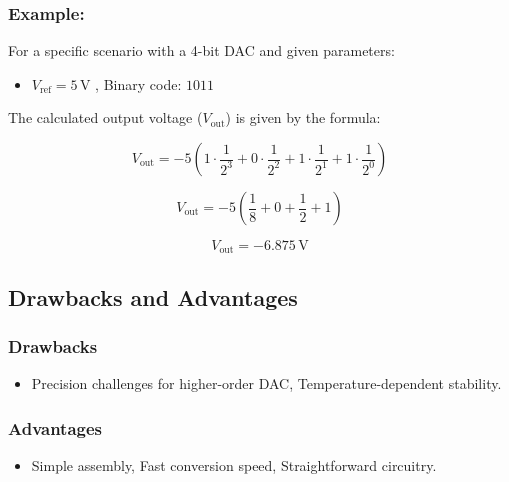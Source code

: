 \documentclass{article}
\begin{document}
\subsubsection{Example:}
For a specific scenario with a 4-bit DAC and given parameters:

\begin{itemize}
    \item \( V_{\text{ref}} = 5 \, \text{V} \) , Binary code: \( 1011 \)
\end{itemize}

The calculated output voltage (\( V_{\text{out}} \)) is given by the formula:


{\fontsize{10}{6}\selectfont
\begin{equation}
    V_{\text{out}} = -5 \left( 1 \cdot \frac{1}{2^3} + 0 \cdot \frac{1}{2^2} + 1 \cdot \frac{1}{2^1} + 1 \cdot \frac{1}{2^0} \right)
\end{equation}

\begin{equation}
    V_{\text{out}} = -5 \left( \frac{1}{8} + 0 + \frac{1}{2} + 1 \right)
\end{equation}

\begin{equation}
    V_{\text{out}} = -6.875 \, \text{V}
\end{equation}
}
\subsection{Drawbacks and Advantages}

\subsubsection{Drawbacks}
\begin{itemize}
    \item Precision challenges for higher-order DAC, Temperature-dependent stability.
\end{itemize}

\subsubsection{Advantages}
\begin{itemize}
    \item Simple assembly, Fast conversion speed, Straightforward circuitry.
\end{itemize}
\end{document}
